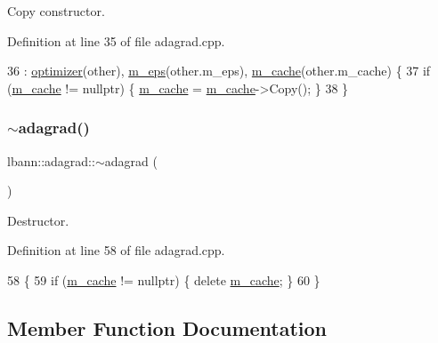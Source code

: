 Copy constructor. 

Definition at line 35 of file adagrad.\+cpp.


\begin{DoxyCode}
36   : \hyperlink{classlbann_1_1optimizer_a136ed79c3f279ecded5be380fb67b05f}{optimizer}(other), \hyperlink{classlbann_1_1adagrad_aace057f88a46dab327f6409716dbe8de}{m\_eps}(other.m\_eps), \hyperlink{classlbann_1_1adagrad_a5eaf0d220d2be78d91455ba85eef3e9a}{m\_cache}(other.m\_cache) \{
37   \textcolor{keywordflow}{if} (\hyperlink{classlbann_1_1adagrad_a5eaf0d220d2be78d91455ba85eef3e9a}{m\_cache} != \textcolor{keyword}{nullptr}) \{ \hyperlink{classlbann_1_1adagrad_a5eaf0d220d2be78d91455ba85eef3e9a}{m\_cache} = \hyperlink{classlbann_1_1adagrad_a5eaf0d220d2be78d91455ba85eef3e9a}{m\_cache}->Copy(); \}
38 \}
\end{DoxyCode}
\mbox{\label{classlbann_1_1adagrad_aa8dcd50b119871cbe1db9817fc00ea52}} 
\subsubsection{\texorpdfstring{$\sim$adagrad()}{~adagrad()}}
{\footnotesize\ttfamily lbann\+::adagrad\+::$\sim$adagrad (\begin{DoxyParamCaption}{ }\end{DoxyParamCaption})\hspace{0.3cm}{\ttfamily [override]}}

Destructor. 

Definition at line 58 of file adagrad.\+cpp.


\begin{DoxyCode}
58                   \{
59   \textcolor{keywordflow}{if} (\hyperlink{classlbann_1_1adagrad_a5eaf0d220d2be78d91455ba85eef3e9a}{m\_cache} != \textcolor{keyword}{nullptr}) \{ \textcolor{keyword}{delete} \hyperlink{classlbann_1_1adagrad_a5eaf0d220d2be78d91455ba85eef3e9a}{m\_cache}; \}
60 \}
\end{DoxyCode}


\subsection{Member Function Documentation}
\mbox{\label{classlbann_1_1adagrad_a4e8a72adf65df84d15f24fe6be03d1b1}} 
